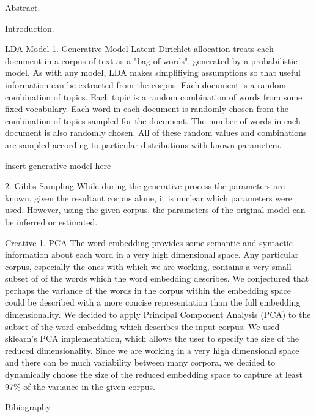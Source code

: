 

Abstract.

Introduction.



LDA Model
1. Generative Model
Latent Dirichlet allocation treats each document in a corpus of text as a "bag of words", generated
by a probabilistic model.
As with any model, LDA makes simplifiying assumptions so that useful information can be extracted
from the corpus.
Each document is a random combination of topics.
Each topic is a random combination of words from some fixed vocabulary.
Each word in each document is randomly chosen from the combination of topics sampled for the document.
The number of words in each document is also randomly chosen.
All of these random values and combinations are sampled according to particular distributions with
known parameters.

insert generative model here


2. Gibbs Sampling
While during the generative process the parameters are known, given the resultant corpus alone, it is unclear
which parameters were used.
However, using the given corpus, the parameters of the original model can be inferred or estimated.







Creative
1. PCA
The word embedding provides some semantic and syntactic information about each word in a very high
dimensional space.
Any particular corpus, especially the ones with which we are working, contains a very small subset of
of the words which the word embedding describes.
We conjectured that perhaps the variance of the words in the corpus within the embedding space
could be described with a more concise representation than the full embedding dimensionality.
We decided to apply Principal Component Analysis (PCA) to the subset of the word embedding which describes
the input corpus.
We used sklearn's PCA implementation, which allows the user to specify the size of the reduced
dimensionality.
Since we are working in a very high dimensional space and there can be much variability between
many corpora, we decided to dynamically choose the size of the reduced embedding space to capture
at least 97\% of the variance in the given corpus.

Bibiography
